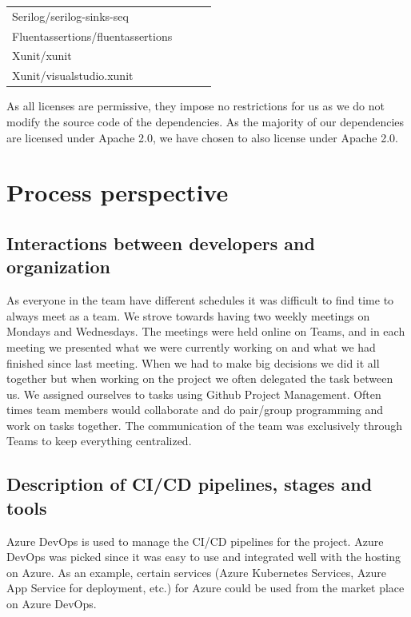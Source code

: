 \documentclass{article}
\begin{document}
\begin{table}[H]
\begin{tabular}{|l|l|l|l|}
       Serilog/serilog-sinks-seq              &                               &                \\
       Fluentassertions/fluentassertions      &                               &                \\
       Xunit/xunit                            &                               &                \\
       Xunit/visualstudio.xunit               &                               &                \\
                                                                                                \hline
    \end{tabular}
\end{table}

As all licenses are permissive, they impose no restrictions for us as we do not modify the source code of the dependencies. As the majority of our dependencies are licensed under Apache 2.0, we have chosen to also license under Apache 2.0. 

\section{Process perspective}
\subsection{Interactions between developers and organization}
As everyone in the team have different schedules it was difficult to find time to always meet as a team. We strove towards having two weekly meetings on Mondays and Wednesdays. The meetings were held online on Teams, and in each meeting we presented what we were currently working on and what we had finished since last meeting. When we had to make big decisions we did it all together but when working on the project we often delegated the task between us. We assigned ourselves to tasks using Github Project Management. Often times team members would collaborate and do pair/group programming and work on tasks together. The communication of the team was exclusively through Teams to keep everything centralized.

\subsection{Description of CI/CD pipelines, stages and tools}
Azure DevOps is used to manage the CI/CD pipelines for the project. Azure DevOps was picked since it was easy to use and integrated well with the hosting on Azure. As an example, certain services (Azure Kubernetes Services, Azure App Service for deployment, etc.) for Azure could be used from the market place on Azure DevOps. %
\end{document}

